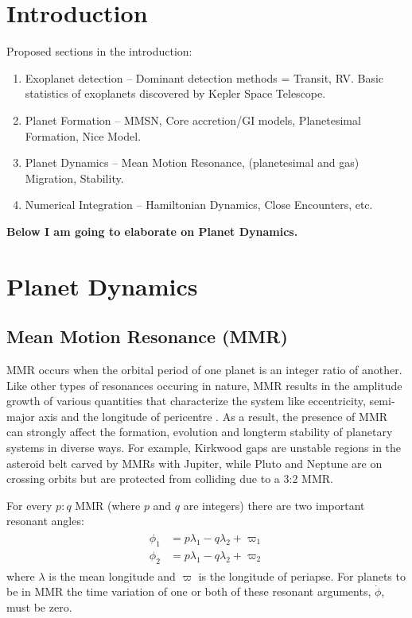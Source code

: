 \documentclass[12pt,letter]{aastex}
\date{Draft version: \today}
\begin{document}
\section{Introduction}

Proposed sections in the introduction:
\begin{enumerate}
\item Exoplanet detection -- Dominant detection methods = Transit, RV. Basic statistics of exoplanets discovered by Kepler Space Telescope. 
\item Planet Formation -- MMSN, Core accretion/GI models, Planetesimal Formation, Nice Model. 
\item Planet Dynamics -- Mean Motion Resonance, (planetesimal and gas) Migration, Stability.
\item Numerical Integration -- Hamiltonian Dynamics, Close Encounters, etc. 
\end{enumerate}

\textbf{Below I am going to elaborate on Planet Dynamics. }

\section{Planet Dynamics}
\subsection{Mean Motion Resonance (MMR)}
\label{sec:MMR}
MMR occurs when the orbital period of one planet is an integer ratio of another. 
Like other types of resonances occuring in nature, MMR results in the amplitude growth of various quantities that characterize the system like eccentricity, semi-major axis and the longitude of pericentre \citep{SSD1999}. 
As a result, the presence of MMR can strongly affect the formation, evolution and longterm stability of planetary systems in diverse ways.
For example, Kirkwood gaps are unstable regions in the asteroid belt carved by MMRs with Jupiter, while Pluto and Neptune are on crossing orbits but are protected from colliding due to a 3:2 MMR. 

For every $p:q$ MMR (where $p$ and $q$ are integers) there are two important resonant angles:
\begin{align*}
\begin{split}
\phi_1 &= p\lambda_1 - q\lambda_2 + \varpi_1 \\
\phi_2 &= p\lambda_1 - q\lambda_2 + \varpi_2 
\end{split}
\end{align*}
where $\lambda$ is the mean longitude and $\varpi$ is the longitude of periapse. 
For planets to be in MMR the time variation of one or both of these resonant arguments, $\dot{\phi}$, must be zero.
\end{document}
